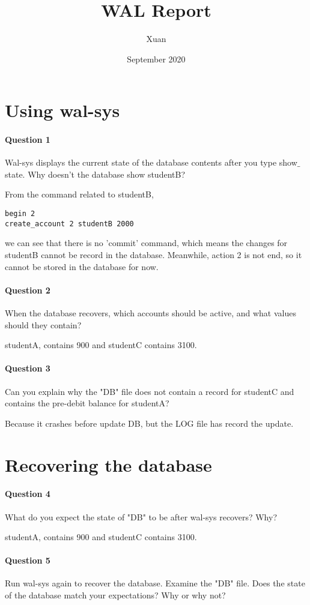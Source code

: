 \documentclass{article}
\title{WAL Report}
\author{Xuan}
\date{September 2020}
\begin{document}
\maketitle

\section{Using wal-sys}
\paragraph{Question 1} Wal-sys displays the current state of the database contents after you type show$\_$state. Why doesn't the database show studentB?

From the command related to studentB,
\lstset{language=C}
\begin{lstlisting}
begin 2
create_account 2 studentB 2000
\end{lstlisting}
we can see that there is no 'commit' command, which means the changes for studentB cannot be record in the database. Meanwhile, action 2 is not end, so it cannot be stored in the database for now.
\paragraph{Question 2} When the database recovers, which accounts should be active, and what values should they contain?

studentA, contains 900 and studentC contains 3100.
\paragraph{Question 3} Can you explain why the "DB" file does not contain a record for studentC and contains the pre-debit balance for studentA?

Because it crashes before update DB, but the LOG file has record the update.

\section{Recovering the database}
\paragraph{Question 4} What do you expect the state of "DB" to be after wal-sys recovers? Why?

studentA, contains 900 and studentC contains 3100.
\paragraph{Question 5} Run wal-sys again to recover the database. Examine the "DB" file. Does the state of the database match your expectations? Why or why not?
\end{document}
